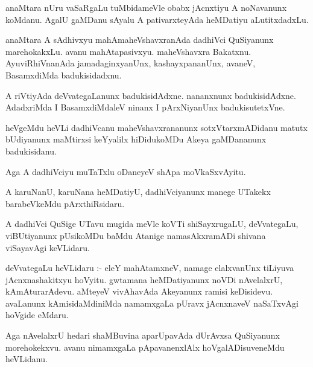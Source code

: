 \documentclass{article}
\begin{document}
\begin{mn}
anaMtara  nUru  vaSaRgaLu  tuMbidameVle  obabx  jAcnxtiyu  A  noNavanunx  koMdanu.  AgalU  gaMDanu  sAyalu  A  
pativarxteyAda  heMDatiyu  aLutitxdadxLu.
\end{mn}

\begin{mn}
anaMtara  A  sAdhivxyu  mahAmaheVshavxranAda  dadhiVci  QuSiyanunx  marehokakxLu.  avanu  mahAtapasivxyu.  maheVshavxra  
Bakatxnu.  AyuviRhiVnanAda  jamadaginxyanUnx,  kashayxpananUnx,  avaneV,  BasamxdiMda  badukisidadxnu.
\end{mn}

\begin{mn}
A riVtiyAda  deVvategaLanunx  badukisidAdxne.  nananxnunx  badukisidAdxne.  AdadxriMda  I  BasamxdiMdaleV  ninanx  
I  pArxNiyanUnx  badukisutetxVne.
\end{mn}

\begin{mn}
heVgeMdu  heVLi  dadhiVcanu  maheVshavxrananunx  sotxVtarxmADidanu  matutx  bUdiyanunx  maMtirxsi  keYyalilx  
hiDidukoMDu  Akeya  gaMDananunx  badukisidanu.
\end{mn}

\begin{mn}
Aga  A  dadhiVciyu  muTaTxlu  oDaneyeV  shApa  moVkaSxvAyitu.
\end{mn}

\begin{mn}
A  karuNanU,  karuNana  heMDatiyU,  dadhiVciyanunx  manege  UTakekx  barabeVkeMdu  pArxthiRsidaru.
\end{mn}

\begin{mn}
A  dadhiVci QuSige  UTavu  mugida  meVle  koVTi  shiSayxrugaLU,  deVvategaLu,  viBUtiyanunx  pUsikoMDu  baMdu  
Atanige  namasAkxramADi  shivana  viSayavAgi  keVLidaru.
\end{mn}

\begin{mn}
deVvategaLu  heVLidaru :- eleY  mahAtamxneV,  namage  elalxvanUnx  tiLiyuva  jAcnxnashakitxyu  hoVyitu.  
gwtamana  heMDatiyanunx  noVDi  nAvelalxrU,  kAmAturarAdevu.  aMteyeV  vivAhavAda  Akeyanunx  ramisi  
keDisidevu.  avaLanunx  kAmisidaMdiniMda  namamxgaLa  pUravx jAcnxnaveV  naSaTxvAgi  hoVgide  eMdaru.
\end{mn}

\begin{mn}
Aga  nAvelalxrU  hedari  shaMBuvina  aparUpavAda  dUrAvxsa  QuSiyanunx  morehokekxvu.  avanu  nimamxgaLa  
pApavanenxlAlx  hoVgalADisuveneMdu  heVLidanu.
\end{mn}
\end{document}
